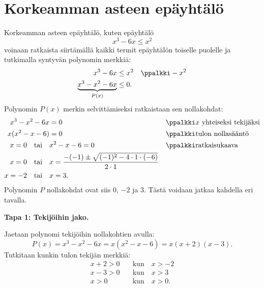 \section{Korkeamman asteen epäyhtälö}
\label{kork_ast}


Korkeamman asteen epäyhtälö, kuten epäyhtälö
\[
x^3 -6x \leq x^2
\]
voinaan ratkaista siirtämällä kaikki termit epäyhtälön toiselle puolelle ja tutkimalla syntyvän polynomin merkkiä:
\begin{align*}
x^3-6x & \leq x^2 & &\ppalkki -x^2 \\
\underbrace{x^3-x^2-6x}_{P(x)} &\leq 0. &&
\end{align*}
Polynomin $P(x)$ merkin selvittämiseksi ratkaistaan sen nollakohdat:
\begin{align*}
    x^3 - x^2-6x &= 0 & &\ppalkki \text{$x$ yhteiseksi tekijäksi} \\
    x(x^2 -x -6) &= 0 & &\ppalkki \text{tulon nollasääntö} \\
    x = 0 \quad \text{tai} \quad & x^2 -x -6 = 0 & &\ppalkki \text{ratkaisukaava} \\
    x= 0 \quad \text{tai} \quad & x=\frac{-(-1) \pm \sqrt{(-1)^2-4\cdot 1 \cdot (-6)}}{2\cdot 1} && \\
    x = -2 \quad \text{tai} \quad & x = 3. &&
\end{align*}
Polynomin $P$ nollakohdat ovat siis $0$, $-2$ ja $3$. Tästä voidaan jatkaa kahdella eri tavalla.

\textbf{Tapa 1: Tekijöihin jako.}

Jaetaan polynomi tekijöihin nollakohtien avulla:
\[
P(x) = x^3 - x^2-6x = x(x^2-x-6) = x(x+2)(x-3).
\]
Tutkitaan kunkin tulon tekijän merkkiä:
\begin{align*}
    x+2>0 & \quad \text{kun} \quad x > -2\\
    x-3>0 & \quad \text{kun} \quad x > 3\\
    x>0 & \quad \text{kun} \quad x > 0.
\end{align*}

